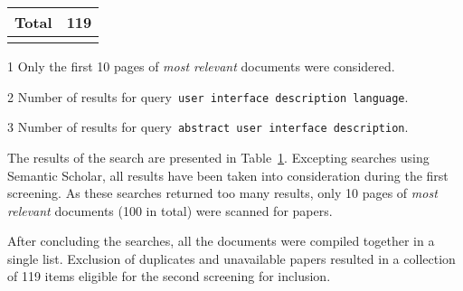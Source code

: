 \begin{table}[]
\begin{threeparttable}[b]
\begin{tabular}{@{}rrcc@{}}
            \midrule
            \multicolumn{3}{r}{\textbf{Total}} & 119 \\
            \bottomrule
            \label{tab:results-first-stage-review-rq-1}
        \end{tabular}
        \begin{tablenotes}
            \item [1] Only the first 10 pages of \emph{most relevant} documents were considered.
            \item [2] Number of results for query\ \verb|user interface description language|.
            \item [3] Number of results for query\ \verb|abstract user interface description|.
        \end{tablenotes}
    \end{threeparttable}
\end{table}

The results of the search are presented in Table~\ref{tab:results-first-stage-review-rq-1}.
Excepting searches using Semantic Scholar, all results have been taken into consideration during the first screening.
As these searches returned too many results, only 10 pages of \emph{most relevant} documents (100 in total) were scanned for papers.

After concluding the searches, all the documents were compiled together in a single list.
Exclusion of duplicates and unavailable papers resulted in a collection of 119 items eligible for the second screening for inclusion.
